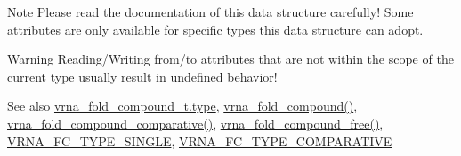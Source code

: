 \begin{DoxyNote}{Note}
Please read the documentation of this data structure carefully! Some attributes are only available for specific types this data structure can adopt.
\end{DoxyNote}
\begin{DoxyWarning}{Warning}
Reading/\+Writing from/to attributes that are not within the scope of the current type usually result in undefined behavior!
\end{DoxyWarning}
\begin{DoxySeeAlso}{See also}
\hyperlink{group__fold__compound_a391bcf8ac5997784aaf780cdd251c464}{vrna\+\_\+fold\+\_\+compound\+\_\+t.\+type}, \hyperlink{group__fold__compound_ga6601d994ba32b11511b36f68b08403be}{vrna\+\_\+fold\+\_\+compound()}, \hyperlink{group__fold__compound_gad6bacc816af274922b13d947f708aa0c}{vrna\+\_\+fold\+\_\+compound\+\_\+comparative()}, \hyperlink{group__fold__compound_ga576a077b418a9c3650e06f8e5d296fc2}{vrna\+\_\+fold\+\_\+compound\+\_\+free()}, \hyperlink{group__fold__compound_gga01a4ff86fa71deaaa5d1abbd95a1447da7e264dd3cf2dc9b6448caabcb7763cd6}{V\+R\+N\+A\+\_\+\+F\+C\+\_\+\+T\+Y\+P\+E\+\_\+\+S\+I\+N\+G\+LE}, \hyperlink{group__fold__compound_gga01a4ff86fa71deaaa5d1abbd95a1447dab821ce46ea3cf665be97df22a76f5023}{V\+R\+N\+A\+\_\+\+F\+C\+\_\+\+T\+Y\+P\+E\+\_\+\+C\+O\+M\+P\+A\+R\+A\+T\+I\+VE}
\end{DoxySeeAlso}
